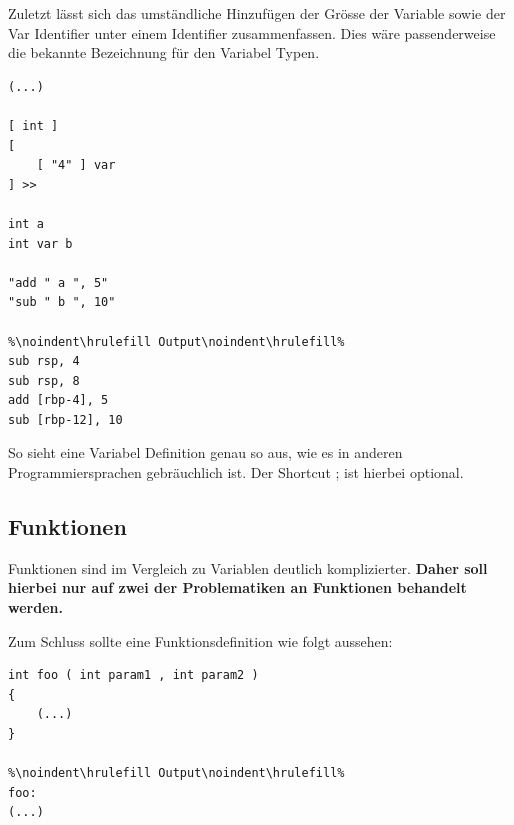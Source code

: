 Zuletzt lässt sich das umständliche Hinzufügen der Grösse der Variable sowie der Var Identifier unter einem Identifier zusammenfassen. Dies wäre passenderweise die bekannte Bezeichnung für den Variabel Typen.

\begin{lstlisting}[language=QHS, caption=Definition einer Variable mit int Identifier]
(...)

[ int ] 
[
    [ "4" ] var
] >>
    
int a 
int var b 
    
"add " a ", 5"
"sub " b ", 10"
        
%\noindent\hrulefill Output\noindent\hrulefill%
sub rsp, 4
sub rsp, 8
add [rbp-4], 5
sub [rbp-12], 10
\end{lstlisting}

So sieht eine Variabel Definition genau so aus, wie es in anderen Programmiersprachen gebräuchlich ist. Der Shortcut ; ist hierbei optional.

\subsection{Funktionen} \label{sec:qhs-funcs}
Funktionen sind im Vergleich zu Variablen deutlich komplizierter. \textbf{Daher soll hierbei nur auf zwei der Problematiken an Funktionen behandelt werden.}

Zum Schluss sollte eine Funktionsdefinition wie folgt aussehen:


\begin{lstlisting}[language=QHS, label=eg:qhs-function_goal, caption=Ziel für die Definition einer Funktion in QHS]
int foo ( int param1 , int param2 )
{
    (...)
}
            
%\noindent\hrulefill Output\noindent\hrulefill%
foo:
(...)
\end{lstlisting}

